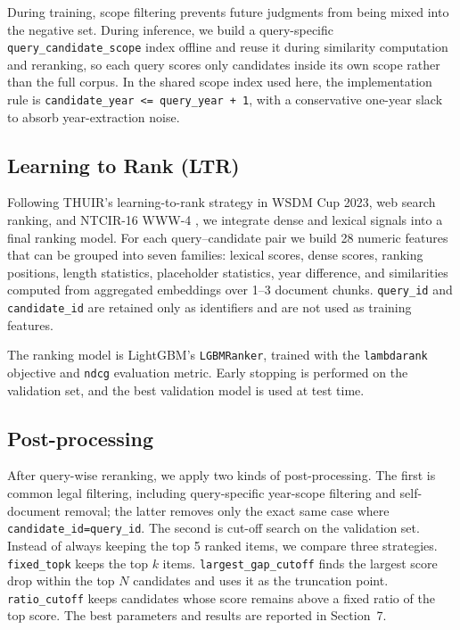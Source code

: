 During training, scope filtering prevents future judgments from being mixed into the negative set. During inference, we build a query-specific \texttt{query\_candidate\_scope} index offline and reuse it during similarity computation and reranking, so each query scores only candidates inside its own scope rather than the full corpus. In the shared scope index used here, the implementation rule is \texttt{candidate\_year <= query\_year + 1}, with a conservative one-year slack to absorb year-extraction noise.

\subsection{Learning to Rank (LTR)}

Following THUIR's learning-to-rank strategy in WSDM Cup 2023, web search ranking, and NTCIR-16 WWW-4 \cite{chen2023wsdmcup,li2023websearch,yang2023ntcir}, we integrate dense and lexical signals into a final ranking model. For each query--candidate pair we build 28 numeric features that can be grouped into seven families: lexical scores, dense scores, ranking positions, length statistics, placeholder statistics, year difference, and similarities computed from aggregated embeddings over 1--3 document chunks. \texttt{query\_id} and \texttt{candidate\_id} are retained only as identifiers and are not used as training features.

The ranking model is LightGBM's \texttt{LGBMRanker}, trained with the \texttt{lambdarank} objective and \texttt{ndcg} evaluation metric. Early stopping is performed on the validation set, and the best validation model is used at test time.

\subsection{Post-processing}

After query-wise reranking, we apply two kinds of post-processing. The first is common legal filtering, including query-specific year-scope filtering and self-document removal; the latter removes only the exact same case where \texttt{candidate\_id=query\_id}. The second is cut-off search on the validation set. Instead of always keeping the top 5 ranked items, we compare three strategies. \texttt{fixed\_topk} keeps the top $k$ items. \texttt{largest\_gap\_cutoff} finds the largest score drop within the top $N$ candidates and uses it as the truncation point. \texttt{ratio\_cutoff} keeps candidates whose score remains above a fixed ratio of the top score. The best parameters and results are reported in Section~7.
